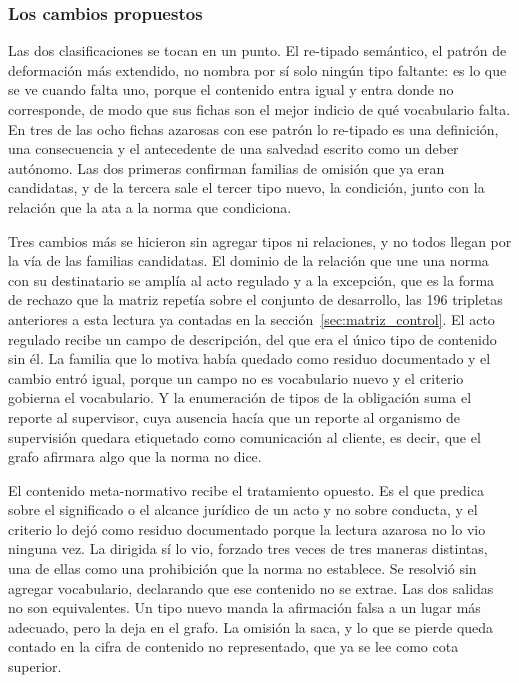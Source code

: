 \documentclass[12pt,a4paper]{report}
\begin{document}
\subsubsection*{Los cambios propuestos}

Las dos clasificaciones se tocan en un punto. El re-tipado semántico, el patrón de deformación más extendido, no nombra por sí solo ningún tipo faltante: es lo que se ve cuando falta uno, porque el contenido entra igual y entra donde no corresponde, de modo que sus fichas son el mejor indicio de qué vocabulario falta. En tres de las ocho fichas azarosas con ese patrón lo re-tipado es una definición, una consecuencia y el antecedente de una salvedad escrito como un deber autónomo. Las dos primeras confirman familias de omisión que ya eran candidatas, y de la tercera sale el tercer tipo nuevo, la condición, junto con la relación que la ata a la norma que condiciona.

Tres cambios más se hicieron sin agregar tipos ni relaciones, y no todos llegan por la vía de las familias candidatas. El dominio de la relación que une una norma con su destinatario se amplía al acto regulado y a la excepción, que es la forma de rechazo que la matriz repetía sobre el conjunto de desarrollo, las 196 tripletas anteriores a esta lectura ya contadas en la sección~\ref{sec:matriz_control}. El acto regulado recibe un campo de descripción, del que era el único tipo de contenido sin él. La familia que lo motiva había quedado como residuo documentado y el cambio entró igual, porque un campo no es vocabulario nuevo y el criterio gobierna el vocabulario. Y la enumeración de tipos de la obligación suma el reporte al supervisor, cuya ausencia hacía que un reporte al organismo de supervisión quedara etiquetado como comunicación al cliente, es decir, que el grafo afirmara algo que la norma no dice.

El contenido meta-normativo recibe el tratamiento opuesto. Es el que predica sobre el significado o el alcance jurídico de un acto y no sobre conducta, y el criterio lo dejó como residuo documentado porque la lectura azarosa no lo vio ninguna vez. La dirigida sí lo vio, forzado tres veces de tres maneras distintas, una de ellas como una prohibición que la norma no establece. Se resolvió sin agregar vocabulario, declarando que ese contenido no se extrae. Las dos salidas no son equivalentes. Un tipo nuevo manda la afirmación falsa a un lugar más adecuado, pero la deja en el grafo. La omisión la saca, y lo que se pierde queda contado en la cifra de contenido no representado, que ya se lee como cota superior.
\end{document}
